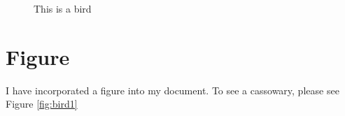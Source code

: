 \documentclass[12pt]{article}
\begin{document}

\begin{figure}%

\begin{center}
\quad %

\quad
{}

\quad
{}

\caption{This is a bird}
\label{fig:bird}

\end{center}
\end{figure}

\section{Figure}
I have incorporated a figure into my document. To see a cassowary, please see Figure \ref{fig:bird1}
\end{document}
